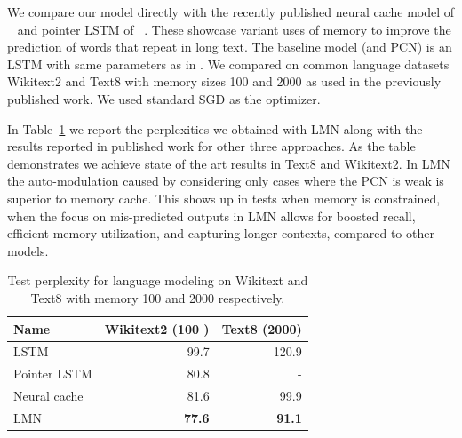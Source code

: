 \documentclass[letterpaper]{article} %
\begin{document}
We compare our model directly with the recently published neural cache model of ~\cite{grave2016improving} and pointer LSTM of ~\cite{merity2016pointer}. These showcase variant uses of memory to improve the prediction of words that repeat in long text.  The baseline model (and PCN) is an LSTM with same parameters as in \cite{grave2016improving}.
%
We compared on common language datasets Wikitext2 and Text8 with memory sizes 100 and 2000 as used in the previously published work. We used standard SGD as the optimizer.

 In Table~\ref{tab-lm} we report the perplexities we obtained with LMN along with the results reported in published work for other three approaches. As the table demonstrates we achieve state of the art results in Text8 and Wikitext2. In LMN the auto-modulation caused by considering only cases where the PCN is weak is superior to memory cache. This shows up in tests when memory is constrained, when the focus on mis-predicted outputs in LMN allows for boosted recall, efficient memory utilization, and capturing longer contexts, compared to other models.

\begin{table}
\begin{center}
\begin{tabular}{|l|r|r|} \hline
Name &    Wikitext2 (100 ) &  Text8 (2000)\\ \hline
LSTM & 99.7 & 120.9 \\
Pointer LSTM &	80.8	& -\\
Neural cache &  81.6 &  99.9\\
LMN &	\textbf{77.6}	& \textbf{91.1}\\ \hline
\end{tabular}
\end{center}
\caption{ \label{tab-lm} Test perplexity for language modeling on Wikitext and Text8 with memory 100 and 2000 respectively.}
\end{table}
\end{document}
